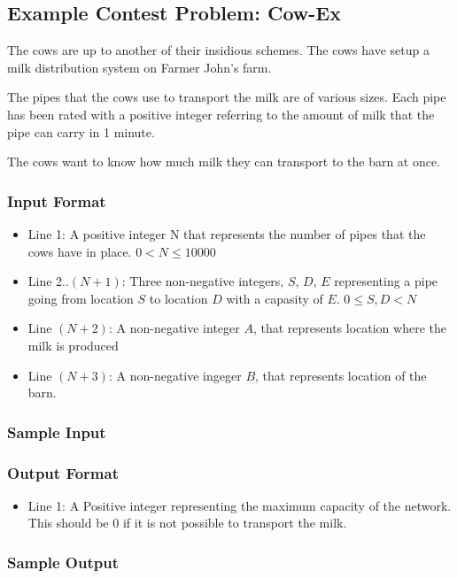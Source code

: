 \subsection{Example Contest Problem: Cow-Ex}
The cows are up to another of their insidious schemes.
The cows have setup a milk distribution system on Farmer John's farm.

The pipes that the cows use to transport the milk are of various sizes.
Each pipe has been rated with a positive integer referring to the amount of milk that the pipe can carry in 1 minute.

The cows want to know how much milk they can transport to the barn at once.
\subsubsection{Input Format}
\begin{itemize}
	\item Line 1: A positive integer N that represents the number of pipes that the cows have in place. $0 < N \leq 10000$
	\item Line 2..$(N+1)$: Three non-negative integers, $S$, $D$, $E$ representing a pipe going from location $S$ to location $D$ with a capasity of $E$. $0 \leq S,D < N$
	\item Line $(N+2)$: A non-negative integer $A$, that represents location where the milk is produced
	\item Line $(N+3)$: A non-negative ingeger $B$, that represents location of the barn.
\end{itemize}

\subsubsection{Sample Input}

\subsubsection{Output Format}
\begin{itemize}
	\item Line 1: A Positive integer representing the maximum capacity of the network.
		This should be 0 if it is not possible to transport the milk.
\end{itemize}
\subsubsection{Sample Output}
